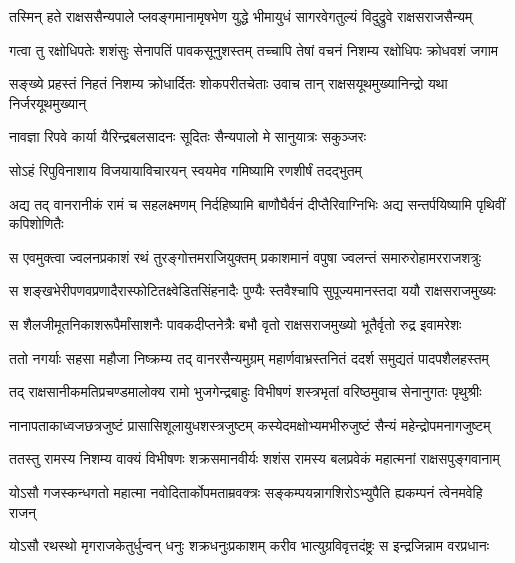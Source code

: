 
\twolineshloka
{तस्मिन् हते राक्षससैन्यपाले प्लवङ्गमानामृषभेण युद्धे}
{भीमायुधं सागरवेगतुल्यं विदुद्रुवे राक्षसराजसैन्यम्} %

\twolineshloka
{गत्वा तु रक्षोधिपतेः शशंसुः सेनापतिं पावकसूनुशस्तम्}
{तच्चापि तेषां वचनं निशम्य रक्षोधिपः क्रोधवशं जगाम} %

\twolineshloka
{सङ्ख्ये प्रहस्तं निहतं निशम्य क्रोधार्दितः शोकपरीतचेताः}
{उवाच तान् राक्षसयूथमुख्यानिन्द्रो यथा निर्जरयूथमुख्यान्} %

\twolineshloka
{नावज्ञा रिपवे कार्या यैरिन्द्रबलसादनः}
{सूदितः सैन्यपालो मे सानुयात्रः सकुञ्जरः} %

\twolineshloka
{सोऽहं रिपुविनाशाय विजयायाविचारयन्}
{स्वयमेव गमिष्यामि रणशीर्षं तदद्भुतम्} %

\threelineshloka
{अद्य तद् वानरानीकं रामं च सहलक्ष्मणम्}
{निर्दहिष्यामि बाणौघैर्वनं दीप्तैरिवाग्निभिः}
{अद्य सन्तर्पयिष्यामि पृथिवीं कपिशोणितैः} %

\twolineshloka
{स एवमुक्त्वा ज्वलनप्रकाशं रथं तुरङ्गोत्तमराजियुक्तम्}
{प्रकाशमानं वपुषा ज्वलन्तं समारुरोहामरराजशत्रुः} %

\twolineshloka
{स शङ्खभेरीपणवप्रणादैरास्फोटितक्ष्वेडितसिंहनादैः}
{पुण्यैः स्तवैश्चापि सुपूज्यमानस्तदा ययौ राक्षसराजमुख्यः} %

\twolineshloka
{स शैलजीमूतनिकाशरूपैर्मांसाशनैः पावकदीप्तनेत्रैः}
{बभौ वृतो राक्षसराजमुख्यो भूतैर्वृतो रुद्र इवामरेशः} %

\twolineshloka
{ततो नगर्याः सहसा महौजा निष्क्रम्य तद् वानरसैन्यमुग्रम्}
{महार्णवाभ्रस्तनितं ददर्श समुद्यतं पादपशैलहस्तम्} %

\twolineshloka
{तद् राक्षसानीकमतिप्रचण्डमालोक्य रामो भुजगेन्द्रबाहुः}
{विभीषणं शस्त्रभृतां वरिष्ठमुवाच सेनानुगतः पृथुश्रीः} %

\twolineshloka
{नानापताकाध्वजछत्रजुष्टं प्रासासिशूलायुधशस्त्रजुष्टम्}
{कस्येदमक्षोभ्यमभीरुजुष्टं सैन्यं महेन्द्रोपमनागजुष्टम्} %

\twolineshloka
{ततस्तु रामस्य निशम्य वाक्यं विभीषणः शक्रसमानवीर्यः}
{शशंस रामस्य बलप्रवेकं महात्मनां राक्षसपुङ्गवानाम्} %

\twolineshloka
{योऽसौ गजस्कन्धगतो महात्मा नवोदितार्कोपमताम्रवक्त्रः}
{सङ्कम्पयन्नागशिरोऽभ्युपैति ह्यकम्पनं त्वेनमवेहि राजन्} %

\twolineshloka
{योऽसौ रथस्थो मृगराजकेतुर्धुन्वन् धनुः शक्रधनुःप्रकाशम्}
{करीव भात्युग्रविवृत्तदंष्ट्रः स इन्द्रजिन्नाम वरप्रधानः} %

